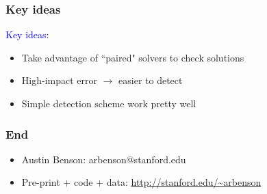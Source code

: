 \documentclass{beamer}
\begin{document}
\begin{frame}
\frametitle{Key ideas}

\textcolor{blue}{Key ideas}:
\begin{itemize}
\item Take advantage of ``paired" solvers to check solutions
\item High-impact error $\to$ easier to detect
\item Simple detection scheme work pretty well
\end{itemize}

\end{frame}

%
\begin{frame}
\frametitle{End}

\begin{itemize}
\item Austin Benson: arbenson@stanford.edu
\item Pre-print + code + data: \url{http://stanford.edu/~arbenson}
\end{itemize}
\end{frame}
\end{document}

